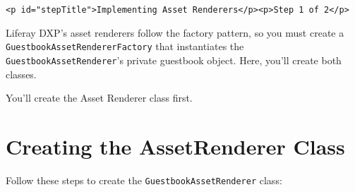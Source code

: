 \begin{verbatim}
<p id="stepTitle">Implementing Asset Renderers</p><p>Step 1 of 2</p>
\end{verbatim}

Liferay DXP's asset renderers follow the factory pattern, so you must
create a \texttt{GuestbookAssetRendererFactory} that instantiates the
\texttt{GuestbookAssetRenderer}'s private guestbook object. Here, you'll
create both classes.

You'll create the Asset Renderer class first.

\section{Creating the AssetRenderer
Class}\label{creating-the-assetrenderer-class}

Follow these steps to create the \texttt{GuestbookAssetRenderer} class:

